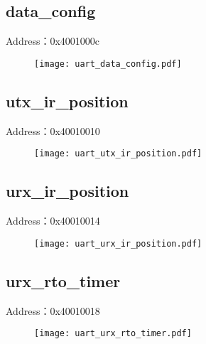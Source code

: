 \subsection{data\_config}
\label{uart-data-config}
Address：0x4001000c
 \begin{figure}[H]
\texttt{[image: uart\_data\_config.pdf]}
\end{figure}

\subsection{utx\_ir\_position}
\label{uart-utx-ir-position}
Address：0x40010010
 \begin{figure}[H]
\texttt{[image: uart\_utx\_ir\_position.pdf]}
\end{figure}

\subsection{urx\_ir\_position}
\label{uart-urx-ir-position}
Address：0x40010014
 \begin{figure}[H]
\texttt{[image: uart\_urx\_ir\_position.pdf]}
\end{figure}

\subsection{urx\_rto\_timer}
\label{uart-urx-rto-timer}
Address：0x40010018
 \begin{figure}[H]
\texttt{[image: uart\_urx\_rto\_timer.pdf]}
\end{figure}

